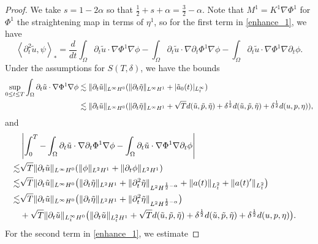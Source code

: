 \documentclass[letterpaper,reqno,10pt,twoside]{amsart}
\theoremstyle{definition}
\theoremstyle{remark}
\def\p{\partial}
\def\Om{\Omega}
\begin{document}
\begin{proof}
			We take $s=1-2\alpha$ so that $\frac12+s+\alpha=\frac32-\alpha$. Note that $M^1=K^1\nabla\Phi^1$ for $\Phi^1$ the straightening map in terms of $\eta^1$, so for the first term in \eqref{enhance_1}, we have
			\begin{equation}\label{enhance_2}
				\left<\p_t^2\tilde{u},\psi\right>_\ast=\frac{d}{dt}\int_\Om \p_t \tilde{u}\cdot\nabla\Phi^1\nabla\phi-\int_\Om \p_t\tilde{u}\cdot\nabla\p_t\Phi^1\nabla\phi-\int_\Om \p_t\tilde{u}\cdot\nabla\Phi^1\nabla\p_t\phi.
			\end{equation}
			Under the assumptions for $S(T, \delta)$, we have the bounds
			\begin{equation}
				\begin{aligned}
					\sup_{0\le t\le T}\int_\Om \p_t \tilde{u}\cdot\nabla\Phi^1\nabla\phi&\lesssim \|\p_t \tilde{u}\|_{L^\infty H^0}(\|\p_t\tilde{\eta}\|_{L^\infty H^1}+|\tilde{a}_{0}(t)|_{L_{t}^{\infty}})\notag\\
					&\lesssim\|\p_t\tilde{u}\|_{L^\infty H^0}(\|\p_t\tilde{\eta}\|_{L^\infty H^1}+\sqrt{T}d(\tilde{u},\tilde{p},\tilde{\eta})+\delta^{\frac{1}{2}} d(\tilde{u},\tilde{p},\tilde{\eta})+\delta^{\frac{1}{2}} d({u},{p},{\eta})),
				\end{aligned}
			\end{equation}
			and
			\begin{equation}
				\begin{aligned}
					&\left|\int_0^T-\int_\Om \p_t\tilde{u}\cdot\nabla\p_t\Phi^1\nabla\phi-\int_\Om \p_t\tilde{u}\cdot\nabla\Phi^1\nabla\p_t\phi\right|\\\lesssim& \sqrt{T}\|\p_t\tilde{u}\|_{L^\infty H^0}(\|\phi\|_{L^2H^1}+\|\p_t\phi\|_{L^2H^1})\\
					\lesssim&\sqrt{T}\|\p_t\tilde{u}\|_{L^\infty H^0}\big(\|\p_t\tilde{\eta}\|_{L^2H^1}+\|\p_t^2\tilde{\eta}\|_{L^2H^{\frac{1}{2}-\alpha}}+\|a(t)\|_{L_{t}^{2}}+\|a(t)^{\prime}\|_{L_{t}^{2}}\big)\notag\\
					\lesssim& \sqrt{T}\|\p_t\tilde{u}\|_{L^\infty H^0}\big(\|\p_t\tilde{\eta}\|_{L^2H^1}+\|\p_t^2\tilde{\eta}\|_{L^2H^{\frac{1}{2}-\alpha}}\big)\\&+\sqrt{T}\|\p_{t}\tilde{u}\|_{L_{t}^{\infty}H^{0}}\big(\|\p_{t}\tilde{u}\|_{L_{t}^{2}H^{1}}+\sqrt{T}d(\tilde{u},\tilde{p},\tilde{\eta})+\delta^{\frac{1}{2}}d(\tilde{u},\tilde{p},\tilde{\eta})+\delta^{\frac{1}{2}} d({u},{p},{\eta})\big).&
				\end{aligned}
			\end{equation}
			For the second term in \eqref{enhance_1}, we estimate

\end{proof}
\end{document}
